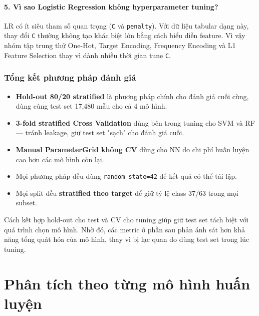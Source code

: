 \documentclass[12pt, a4paper]{article}
\begin{document}
\paragraph{5. Vì sao Logistic Regression không hyperparameter tuning?}

LR có ít siêu tham số quan trọng (\texttt{C} và \texttt{penalty}). Với dữ liệu tabular dạng này, thay đổi \texttt{C} thường không tạo khác biệt lớn bằng cách biểu diễn feature. Vì vậy nhóm tập trung thử One-Hot, Target Encoding, Frequency Encoding và L1 Feature Selection thay vì dành nhiều thời gian tune \texttt{C}.

\subsubsection{Tổng kết phương pháp đánh giá}

\begin{itemize}
    \item \textbf{Hold-out 80/20 stratified} là phương pháp chính cho đánh giá cuối cùng, dùng cùng test set 17{,}480 mẫu cho cả 4 mô hình.

    \item \textbf{3-fold stratified Cross Validation} dùng bên trong tuning cho SVM và RF --- tránh leakage, giữ test set "sạch" cho đánh giá cuối.

    \item \textbf{Manual ParameterGrid không CV} dùng cho NN do chi phí huấn luyện cao hơn các mô hình còn lại.

    \item Mọi phương pháp đều dùng \texttt{random\_state=42} để kết quả có thể tái lập.

    \item Mọi split đều \textbf{stratified theo target} để giữ tỷ lệ class 37/63 trong mọi subset.
\end{itemize}

Cách kết hợp hold-out cho test và CV cho tuning giúp giữ test set tách biệt với quá trình chọn mô hình. Nhờ đó, các metric ở phần sau phản ánh sát hơn khả năng tổng quát hóa của mô hình, thay vì bị lạc quan do dùng test set trong lúc tuning.

\newpage
\section{Phân tích theo từng mô hình huấn luyện}
\end{document}
